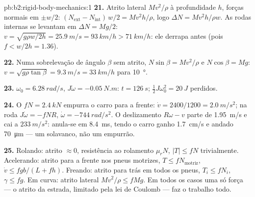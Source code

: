\begin{solution}{pb:b2:rigid-body-mechanics:1}
\textbf{21.} Atrito lateral $Mv^2/\rho$ à profundidade $h$, forças normais em
$\pm w/2$: $(N_{\text{ext}} - N_{\text{int}})\,w/2 = Mv^2h/\rho$, logo $\Delta N =
Mv^2h/\rho w$. As rodas internas se levantam em $\Delta N = Mg/2$: $v = \sqrt{g\rho w/2h} =
\qty{25.9}{m/s} = \qty{93}{km/h} > \qty{71}{km/h}$: ele derrapa antes (pois $f <
w/2h = 1.36$).

\textbf{22.} Numa sobrelevação de ângulo $\beta$ sem atrito, $N\sin\beta =
Mv^2/\rho$ e $N\cos\beta = Mg$: $v = \sqrt{g\rho\tan\beta} = \qty{9.3}{m/s} =
\qty{33}{km/h}$ para \qty{10}{\degree}.

\textbf{23.} $\omega_0 = \qty{6.28}{rad/s}$, $J\dot\omega = \qty{-0.05}{N.m}$: $t =
\qty{126}{s}$; $\tfrac12J\omega_0^2 = \qty{20}{J}$ perdidos.

\textbf{24.} O  $fN = \qty{2.4}{kN}$ empurra o carro para a frente:
$\dot v = 2400/1200 = \qty{2.0}{m/s^2}$; na roda $J\dot\omega = -fNR$,
$\dot\omega = \qty{-744}{rad/s^2}$. O deslizamento $R\omega - v$ parte de \qty{1.95}{m/s}
e cai a $\qty{233}{m/s^2}$: anula-se em \qty{8.4}{ms}, tendo o carro
ganho \qty{1.7}{cm/s} e andado \qty{70}{\micro m} --- um solavanco, não um empurrão.

\textbf{25.} Rolando: atrito $\approx 0$, resistência ao rolamento $\mu_rN$,
$|T| \le fN$ trivialmente. Acelerando: atrito para a frente nos pneus
motrizes, $T \le fN_{\text{motriz}}$, $\dot v \le fgb/(L + fh)$. Freando:
atrito para trás em todos os pneus, $T_i \le fN_i$, $\gamma \le fg$.
Em curva: atrito lateral $Mv^2/\rho \le fMg$. Em todos os casos uma só
força --- o atrito da estrada, limitado pela lei de Coulomb --- faz o
trabalho todo.
\end{solution}
